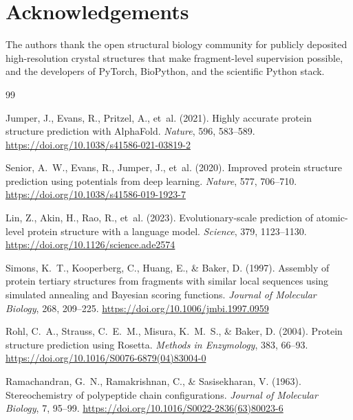 \documentclass[11pt,a4paper]{article}
\begin{document}
\section*{Acknowledgements}

The authors thank the open structural biology community for publicly deposited high-resolution crystal structures that make fragment-level supervision possible, and the developers of PyTorch, BioPython, and the scientific Python stack.

\begin{thebibliography}{99}

Jumper, J., Evans, R., Pritzel, A., et~al. (2021).
Highly accurate protein structure prediction with AlphaFold.
\textit{Nature}, 596, 583--589.
\url{https://doi.org/10.1038/s41586-021-03819-2}

Senior, A.~W., Evans, R., Jumper, J., et~al. (2020).
Improved protein structure prediction using potentials from deep learning.
\textit{Nature}, 577, 706--710.
\url{https://doi.org/10.1038/s41586-019-1923-7}

Lin, Z., Akin, H., Rao, R., et~al. (2023).
Evolutionary-scale prediction of atomic-level protein structure with a language model.
\textit{Science}, 379, 1123--1130.
\url{https://doi.org/10.1126/science.ade2574}

Simons, K.~T., Kooperberg, C., Huang, E., \& Baker, D. (1997).
Assembly of protein tertiary structures from fragments with similar local sequences using simulated annealing and Bayesian scoring functions.
\textit{Journal of Molecular Biology}, 268, 209--225.
\url{https://doi.org/10.1006/jmbi.1997.0959}

Rohl, C.~A., Strauss, C.~E.~M., Misura, K.~M.~S., \& Baker, D. (2004).
Protein structure prediction using Rosetta.
\textit{Methods in Enzymology}, 383, 66--93.
\url{https://doi.org/10.1016/S0076-6879(04)83004-0}

Ramachandran, G.~N., Ramakrishnan, C., \& Sasisekharan, V. (1963).
Stereochemistry of polypeptide chain configurations.
\textit{Journal of Molecular Biology}, 7, 95--99.
\url{https://doi.org/10.1016/S0022-2836(63)80023-6}


\end{thebibliography}
\end{document}
